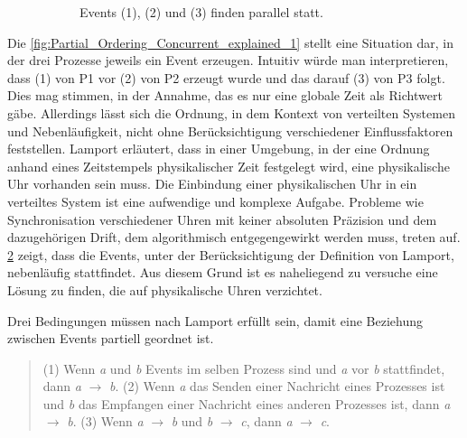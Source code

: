 \begin{figure}[!ht]
\begin{subfigure}[t]{.49\linewidth}
		\caption[Abbildung]{Events (1), (2) und (3) finden parallel statt.}
		\label{fig:Partial_Ordering_Concurrent_explained_2}
	\end{subfigure}
\caption[Partielle Ordnung der Events dreier Prozesse]{}
\end{figure} 


Die \cref{fig:Partial_Ordering_Concurrent_explained_1} stellt eine Situation dar, in der drei Prozesse jeweils ein Event erzeugen. Intuitiv würde man interpretieren, dass (1) von P1 vor (2) von P2 erzeugt wurde und das darauf (3) von P3 folgt. Dies mag stimmen, in der Annahme, das es nur eine globale Zeit als Richtwert gäbe. Allerdings lässt sich die Ordnung, in dem Kontext von verteilten Systemen und Nebenläufigkeit, nicht ohne Berücksichtigung verschiedener Einflussfaktoren feststellen. Lamport erläutert, dass in einer Umgebung, in der eine Ordnung anhand eines Zeitstempels physikalischer Zeit festgelegt wird, eine physikalische Uhr vorhanden sein muss. Die Einbindung einer physikalischen Uhr in ein verteiltes System ist eine aufwendige und komplexe Aufgabe. Probleme wie Synchronisation verschiedener Uhren mit keiner absoluten Präzision und dem dazugehörigen Drift, dem algorithmisch entgegengewirkt werden muss, treten auf. \cref{fig:Partial_Ordering_Concurrent_explained_2} zeigt, dass die Events, unter der Berücksichtigung der Definition von Lamport, nebenläufig stattfindet.  Aus diesem Grund ist es naheliegend zu versuche eine Lösung zu finden, die auf physikalische Uhren verzichtet.


Drei Bedingungen müssen nach Lamport erfüllt sein, damit eine Beziehung zwischen Events partiell geordnet ist. 
\begin{quote}
	\cbstart
	\glqq (1) Wenn \emph{a} und \emph{b} Events im selben Prozess sind und \emph{a} vor \emph{b} stattfindet, dann \emph{a} $\rightarrow$ \emph{b}. (2) Wenn \emph{a} das Senden einer Nachricht eines Prozesses ist und \emph{b} das Empfangen einer Nachricht eines anderen Prozesses ist, dann \emph{a} $\rightarrow$ \emph{b}. (3) Wenn \emph{a} $\rightarrow$ \emph{b} und \emph{b} $\rightarrow$ \emph{c}, dann \emph{a} $\rightarrow$ \emph{c}.\grqq \:
	\cbend
\end{quote}


